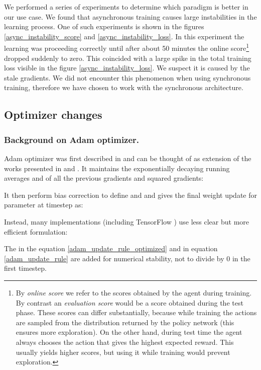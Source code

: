 \documentclass{llncs}
\begin{document}
We performed a series of experiments to determine which paradigm is better in our use case. We found that asynchronous training causes large instabilities in the learning process. One of such experiments is shown in the figures \ref{async_instability_score} and \ref{async_instability_loss}. In this experiment the learning was proceeding correctly until after about 50 minutes the online score\footnote{By \textit{online score} we refer to the scores obtained by the agent during training. By contrast an \textit{evaluation score} would be a score obtained during the test phase. These scores can differ substantially, because while training the actions are sampled from the distribution returned by the policy network (this ensures more exploration). On the other hand, during test time the agent always chooses the action that gives the highest expected reward. This usually yields higher scores, but using it while training would prevent exploration.}
dropped suddenly to zero. This coincided with a large spike in the total training loss visible in the figure \ref{async_instability_loss}. We suspect it is caused by the stale gradients. We did not encounter this phenomenon when using synchronous training, therefore we have chosen to work with the synchronous architecture.

\subsection{Optimizer changes}\label{section_optimizers}

\subsubsection{Background on Adam optimizer.} \label{adam_background}
Adam optimizer was first described in \cite{adam_paper} and can be thought of as extension of the works presented in 
\cite{rmsprop_paper} and \cite{adagrad}. It maintains the exponentially decaying running averages  and  of all the previous gradients and squared gradients:

It then perform bias correction to define  and  and gives the final weight update for parameter  at timestep  as:

Instead, many implementations (including TensorFlow \cite{tensorflow2015-whitepaper}) use less clear but more efficient formulation:


The  in the equation \ref{adam_update_rule_optimized} and  in equation \ref{adam_update_rule} are added for numerical stability, not to divide by 0 in the first timestep.
\end{document}
